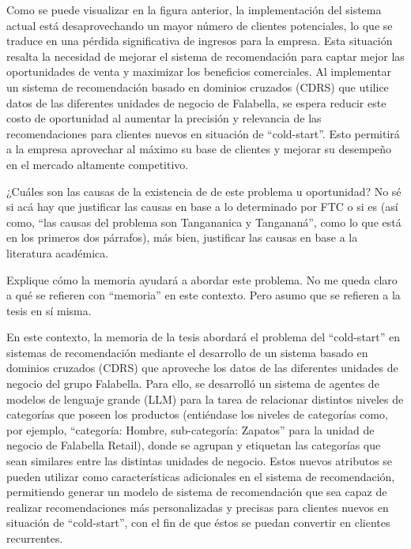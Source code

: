 Como se puede visualizar en la figura anterior, la implementación del sistema actual está desaprovechando un mayor número de clientes potenciales, lo que se traduce en una pérdida significativa de ingresos para la empresa. Esta situación resalta la necesidad de mejorar el sistema de recomendación para captar mejor las oportunidades de venta y maximizar los beneficios comerciales. Al implementar un sistema de recomendación basado en dominios cruzados (CDRS) que utilice datos de las diferentes unidades de negocio de Falabella, se espera reducir este costo de oportunidad al aumentar la precisión y relevancia de las recomendaciones para clientes nuevos en situación de \enquote{cold-start}. Esto permitirá a la empresa aprovechar al máximo su base de clientes y mejorar su desempeño en el mercado altamente competitivo.

¿Cuáles son las causas de la existencia de de este problema u oportunidad?
No sé si acá hay que justificar las causas en base a lo determinado por FTC o si es (así como, \enquote{las causas del problema son Tangananica y Tangananá}, como lo que está en los primeros dos párrafos), más bien, justificar las causas en base a la literatura académica.

Explique cómo la memoria ayudará a abordar este problema.
No me queda claro a qué se refieren con \enquote{memoria} en este contexto. Pero asumo que se refieren a la tesis en sí misma.

En este contexto, la memoria de la tesis abordará el problema del \enquote{cold-start} en sistemas de recomendación mediante el desarrollo de un sistema basado en dominios cruzados (CDRS) que aproveche los datos de las diferentes unidades de negocio del grupo Falabella. Para ello, se desarrolló un sistema de agentes de modelos de lenguaje grande (LLM) para la tarea de relacionar distintos niveles de categorías que poseen los productos (entiéndase los niveles de categorías como, por ejemplo, \enquote{categoría: Hombre, sub-categoría: Zapatos} para la unidad de negocio de Falabella Retail), donde se agrupan y etiquetan las categorías que sean similares entre las distintas unidades de negocio. Estos nuevos atributos se pueden utilizar como características adicionales en el sistema de recomendación, permitiendo generar un modelo de sistema de recomendación que sea capaz de realizar recomendaciones más personalizadas y precisas para clientes nuevos en situación de \enquote{cold-start}, con el fin de que éstos se puedan convertir en clientes recurrentes.